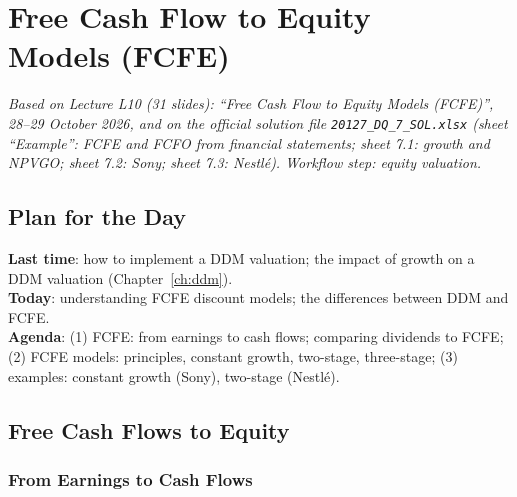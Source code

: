 \chapter[Free Cash Flow to Equity Models (FCFE)]{Free Cash Flow to Equity\\Models (FCFE)}\label{ch:fcfe}

\emph{Based on Lecture L10 (31 slides): ``Free Cash Flow to Equity Models (FCFE)'', 28--29 October 2026, and on the official solution file \texttt{20127\_DQ\_7\_SOL.xlsx} (sheet ``Example'': FCFE and FCFO from financial statements; sheet 7.1: growth and NPVGO; sheet 7.2: Sony; sheet 7.3: Nestl\'e). Workflow step: equity valuation.}

\section{Plan for the Day}
\textbf{Last time}: how to implement a DDM valuation; the impact of growth on a DDM valuation (Chapter~\ref{ch:ddm}).\\
\textbf{Today}: understanding FCFE discount models; the differences between DDM and FCFE.\\
\textbf{Agenda}: (1) FCFE: from earnings to cash flows; comparing dividends to FCFE; (2) FCFE models: principles, constant growth, two-stage, three-stage; (3) examples: constant growth (Sony), two-stage (Nestl\'e).

\section{Free Cash Flows to Equity}

\subsection{From Earnings to Cash Flows}

